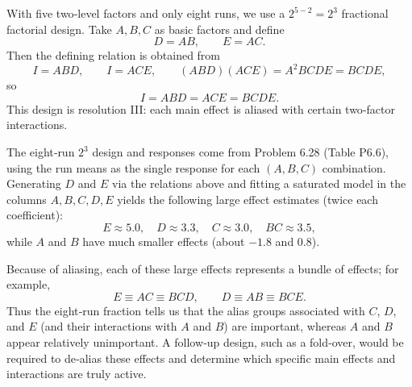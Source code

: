 \documentclass[answers,12pt,addpoints]{exam}
\begin{document}
\begin{solution}
With five two‑level factors and only eight runs, we use a $2^{5-2}=2^3$ fractional factorial design. Take $A,B,C$ as basic factors and define
\[
D = AB,\qquad E = AC.
\]
Then the defining relation is obtained from
\[
I = ABD,\qquad I = ACE,\qquad (ABD)(ACE) = A^2 B C D E = BCDE,
\]
so
\[
I = ABD = ACE = BCDE.
\]
This design is resolution III: each main effect is aliased with certain two‑factor interactions.

The eight‑run $2^3$ design and responses come from Problem 6.28 (Table P6.6), using the run means as the single response for each $(A,B,C)$ combination. Generating $D$ and $E$ via the relations above and fitting a saturated model in the columns $A,B,C,D,E$ yields the following large effect estimates (twice each coefficient):
\[
E \approx 5.0,\quad D \approx 3.3,\quad C \approx 3.0,\quad BC \approx 3.5,
\]
while $A$ and $B$ have much smaller effects (about $-1.8$ and $0.8$).

Because of aliasing, each of these large effects represents a bundle of effects; for example,
\[
E \equiv AC \equiv BCD,\qquad D \equiv AB \equiv BCE.
\]
Thus the eight‑run fraction tells us that the alias groups associated with $C$, $D$, and $E$ (and their interactions with $A$ and $B$) are important, whereas $A$ and $B$ appear relatively unimportant. A follow‑up design, such as a fold‑over, would be required to de‑alias these effects and determine which specific main effects and interactions are truly active.
\end{solution}
\end{document}
